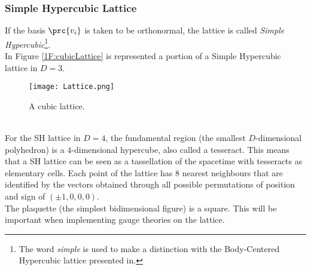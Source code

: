 \subsubsection{Simple Hypercubic Lattice\label{Sec1:SHLattice}}
If the basis $\prc{v_i}$ is taken to be orthonormal, the lattice is called \emph{Simple Hypercubic}\footnote{The word \emph{simple} is used to make a distinction with the Body-Centered Hypercubic lattice presented in.}.\\
In Figure \eqref{1F:cubicLattice} is represented a portion of a Simple Hypercubic lattice in $D=3$.
\begin{figure}[!htbp]
    \centering
    \texttt{[image: Lattice.png]}
    \caption{A cubic lattice.}
    \label{1F:cubicLattice}
\end{figure}\\
For the SH lattice in $D=4$, the fundamental region (the smallest $D$-dimensional polyhedron) is a $4$-dimensional hypercube, also called a tesseract.
This means that a SH lattice can be seen as a tassellation of the spacetime with tesseracts as elementary cells.
Each point of the lattice has $8$ nearest neighbours that are identified by the vectors obtained through all possible permutations of position and sign of $(\pm1,0,0,0)$.\\
The plaquette (the simplest bidimensional figure) is a square.
This will be important when implementing gauge theories on the lattice.

